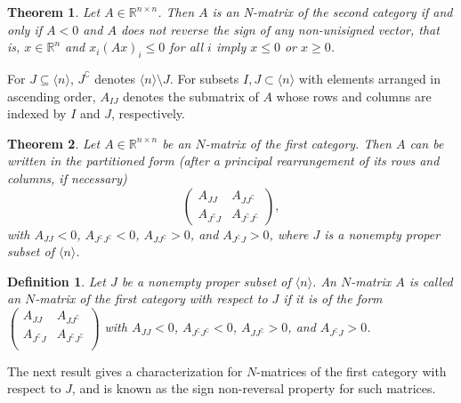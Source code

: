 \documentclass[11pt]{article}
\newtheorem{theorem}{Theorem}[section]
\newtheorem{defn}{Definition}[section]
\begin{document}
\begin{theorem}{\cite[Theorem 2]{par-rav-nmat}}\label{PR}
    Let $A \in \mathbb{R}^{n \times n}$. Then $A$ is an N-matrix of the second category if and only if $A<0$ and $A$ does not reverse the sign of any non-unisigned vector, that is, $x \in \mathbb{R}^n$ and  $x_i(Ax)_i\leq 0 $ for all $i$ imply $x \leq 0$ or $x \geq 0$.
\end{theorem}


 For $J \subseteq \langle n \rangle$, $J^\complement$ denotes $\langle n
 \rangle \setminus J$. For subsets $I, J \subset \langle n \rangle$ with
 elements arranged in ascending order, $A_{IJ}$ denotes the submatrix of
 $A$ whose rows and columns are indexed by $I$ and $J$, respectively.

\begin{theorem}{\cite[Theorem 4.3]{moh-sri-nmat-lcp}} \label{nmat-fir-char1}
    Let $A\in \mathbb{R}^{n \times n}$ be an $N$-matrix of the first category. Then $A$ can be written in the partitioned form (after a principal rearrangement of its rows and columns, if necessary)
    \begin{equation}\label{eq1}
    \begin{pmatrix}
        A_{JJ} & A_{J J^\complement}\\
        A_{J^\complement J} & A_{J^\complement J^\complement}
	\end{pmatrix},
    \end{equation} with $A_{JJ} < 0$, $A_{J^\complement J^\complement}<0$, $A_{JJ^\complement } >0$, and $A_{J^\complement J}>0$, where $J$  is a nonempty proper subset of $ \langle n \rangle$.

\end{theorem}
\begin{defn}\label{defnn1stj}
Let $J$  be a nonempty proper subset of $ \langle n \rangle$.
An $N$-matrix $A$ is called \emph{an $N$-matrix of the first category
with respect to $J$} if  it is of the form  $\begin{pmatrix}
	A_{JJ} & A_{J J^\complement}\\
	A_{J^\complement J} & A_{J^\complement J^\complement} \\
	\end{pmatrix}$ with $A_{JJ} < 0$, $A_{J^\complement J^\complement}<0$, $A_{JJ^\complement } >0$, and $A_{J^\complement J}>0$.
\end{defn}
The next result gives a characterization for $N$-matrices of the first category with respect to $J$, and is known as the sign non-reversal property for such matrices.
\end{document}
